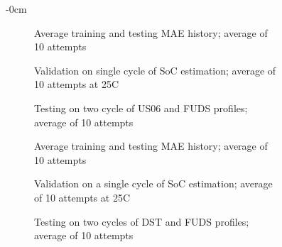 \begin{figure}[H]
    \centering
    \begin{adjustwidth}{-\extralength}{0cm}
    \begin{subfigure}[b]{0.425\textwidth}
        \centering
        
        \caption{Average training and testing MAE history; average of 10 attempts}
    \end{subfigure}
    \hfill
    \begin{subfigure}[b]{0.425\textwidth}
        \centering
        
        \caption{Validation on single cycle of SoC estimation; average of 10 attempts at 25\textdegree{}C}
    \end{subfigure}
    \hfill
    \begin{subfigure}[b]{0.425\textwidth}
        \centering
        
        \caption{Testing on two cycle of US06 and FUDS profiles; average of 10 attempts}
        \label{subfig:Model-4res-DSTvsFUDS}
    \end{subfigure}
    \begin{subfigure}[b]{0.425\textwidth}
        \centering
        
        \caption{Average training and testing MAE history; average of 10 attempts}
    \end{subfigure}
    \hfill
    \begin{subfigure}[b]{0.425\textwidth}
        \centering
        
        \caption{Validation on a single cycle of SoC estimation; average of 10 attempts at 25\textdegree{}C}
    \end{subfigure}
    \hfill
    \begin{subfigure}[b]{0.425\textwidth}
        \centering
        
        \caption{Testing on two cycles of DST and FUDS profiles; average of 10 attempts}
    \end{subfigure}
    \begin{subfigure}[b]{0.425\textwidth}
        \centering
        

\end{subfigure}
\end{adjustwidth}
\end{figure}
